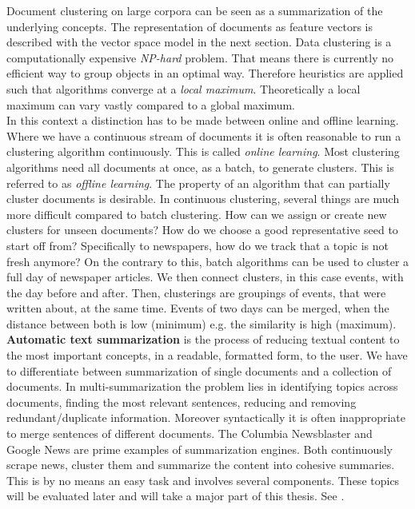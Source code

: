   Document clustering on large corpora can be seen as a summarization of the underlying concepts. The representation of documents as feature vectors is described with the vector space model in the next section. Data clustering is a computationally expensive \emph{NP-hard} problem. That means there is currently no efficient way to group objects in an optimal way. Therefore heuristics are applied such that algorithms converge at a  \emph{local maximum}. Theoretically a local maximum can vary vastly compared to a global maximum.\\ 

  In this context a distinction has to be made between online and offline learning. Where we have a continuous stream of documents it is often reasonable to run a clustering algorithm continuously. This is called \emph{online learning}. Most clustering algorithms need all documents at once, as a batch, to generate clusters. This is referred to as \emph{offline learning}. The property of an algorithm that can partially cluster documents is desirable. In continuous clustering, several things are much more difficult compared to batch clustering. How can we assign or create new clusters for unseen documents? How do we choose a good representative seed to start off from? Specifically to newspapers, how do we track that a topic is not fresh anymore? On the contrary to this, batch algorithms can be used to cluster a full day of newspaper articles. We then connect clusters, in this case events, with the day before and after. Then, clusterings are groupings of events, that were written about, at the same time. Events of two days can be merged, when the distance between both is low (minimum) e.g. the similarity is high (maximum).\\

  \textbf{Automatic text summarization} is the process of reducing textual content to the most important concepts, in a readable, formatted form, to the user. \cite{SumEvaluation2001} We have to differentiate between summarization of single documents and a collection of documents. In multi-summarization the problem lies in identifying topics across documents, finding the most relevant sentences, reducing and removing redundant/duplicate information. Moreover syntactically it is often inappropriate to merge sentences of different documents. The Columbia Newsblaster and Google News are prime examples of summarization engines. Both continuously scrape news, cluster them and summarize the content into cohesive summaries. This is by no means an easy task and involves several components. These topics will be evaluated later and will take a major part of this thesis. See \cite{NewsBlaster2002, ColumbiaExperimentsSum2002}.\\

